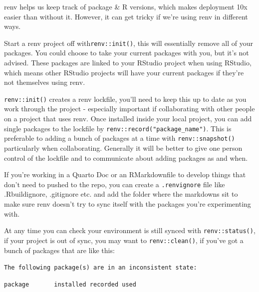 \documentclass[
  letterpaper,
  DIV=11,
  numbers=noendperiod]{scrreprt}
\begin{document}
\begin{tcolorbox}[enhanced jigsaw, colback=white, opacitybacktitle=0.6, coltitle=black, left=2mm, breakable, bottomtitle=1mm, toptitle=1mm, toprule=.15mm, colframe=quarto-callout-tip-color-frame, titlerule=0mm, title=\textcolor{quarto-callout-tip-color}{\faLightbulb}\hspace{0.5em}{On using renv collaboratively}, colbacktitle=quarto-callout-tip-color!10!white, rightrule=.15mm, bottomrule=.15mm, arc=.35mm, opacityback=0, leftrule=.75mm]

renv helps us keep track of package \& R versions, which makes
deployment 10x easier than without it. However, it can get tricky if
we're using renv in different ways.

Start a renv project off with\texttt{renv::init()}, this will
essentially remove all of your packages. You could choose to take your
current packages with you, but it's not advised. These packages are
linked to your RStudio project when using RStudio, which means other
RStudio projects will have your current packages if they're not
themselves using renv.

\texttt{renv::init()} creates a renv lockfile, you'll need to keep this
up to date as you work through the project - especially important if
collaborating with other people on a project that uses renv. Once
installed inside your local project, you can add single packages to the
lockfile by \texttt{renv::record("package\_name")}. This is preferable
to adding a bunch of packages at a time with \texttt{renv::snapshot()}
particularly when collaborating. Generally it will be better to give one
person control of the lockfile and to communicate about adding packages
as and when.

If you're working in a Quarto Doc or an RMarkdownfile to develop things
that don't need to pushed to the repo, you can create a
\texttt{.renvignore} file like .Rbuildignore, .gitignore etc. and add
the folder where the markdowns sit to make sure renv doesn't try to sync
itself with the packages you're experimenting with.

At any time you can check your environment is still synced with
\texttt{renv::status()}, if your project is out of sync, you may want to
\texttt{renv::clean()}, if you've got a bunch of packages that are like
this:

\texttt{The\ following\ package(s)\ are\ in\ an\ inconsistent\ state:}

\texttt{package\ \ \ \ \ \ \ installed\ recorded\ used}


\end{tcolorbox}
\end{document}
